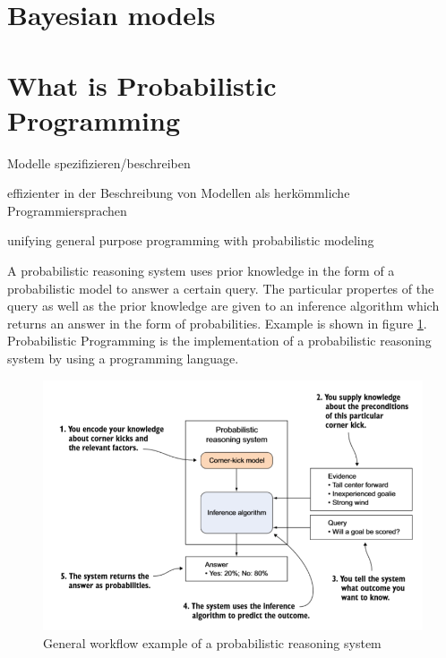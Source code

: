 \documentclass{article}
\begin{document}
\section{Bayesian models}

\section{What is Probabilistic Programming}

Modelle spezifizieren/beschreiben

\cite{wiki:Probabilisticprogramminglanguage}

effizienter in der Beschreibung von Modellen als herkömmliche Programmiersprachen \cite{Hardesty2015}

unifying general purpose programming with probabilistic modeling \cite{probabilistic-programming.org}


A \gls{probabilistic reasoning system} uses prior knowledge in the form of a \gls{probabilistic model} to answer a certain query. The particular propertes of the query as well as the prior knowledge are given to an \gls{inference algorithm} which returns an answer in the form of probabilities. Example is shown in figure \ref{fig:example_prs}. Probabilistic Programming is the implementation of a \gls{probabilistic reasoning system} by using a programming language.

\begin{figure}
\includegraphics[width=\textwidth]{images/probabilistic_reasoning_system.PNG}
\caption[General workflow example of a probabilistic reasoning system. Source: \cite{9781617292330}]{General workflow example of a probabilistic reasoning system}
\label{fig:example_prs}
\end{figure}
\end{document}
